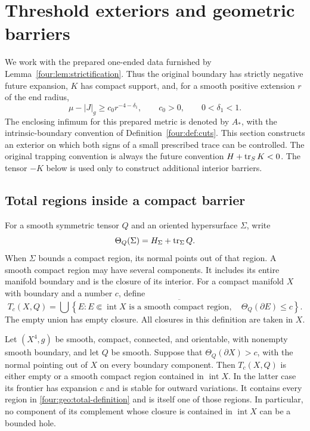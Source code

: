 \section{Threshold exteriors and geometric barriers}\label{four:sec:geometry}

We work with the prepared one-ended data furnished by
Lemma~\ref{four:lem:strictification}.  Thus the original boundary has strictly
negative future expansion, $K$ has compact support, and, for a smooth positive
extension $r$ of the end radius,
\begin{equation}\label{four:geo:prepared-gap}
 \mu-|J|_g\ge c_0r^{-4-\delta_1},\qquad c_0>0,\qquad 0<\delta_1<1.
\end{equation}
The enclosing infimum for this prepared metric is denoted by $A_*$, with the
intrinsic-boundary convention of Definition~\ref{four:def:cuts}.  This section
constructs an exterior on which both signs of a small prescribed trace can be
controlled.  The original trapping convention is always the future convention
$H+\operatorname{tr}_S K<0$.  The tensor $-K$ below is used only to construct additional
interior barriers.

\subsection{Total regions inside a compact barrier}

For a smooth symmetric tensor $Q$ and an oriented hypersurface $\Sigma$, write
\[
 \Theta_Q(\Sigma)=H_\Sigma+\operatorname{tr}_\Sigma Q.
\]
When $\Sigma$ bounds a compact region, its normal points out of that region.
A smooth compact region may have several components.  It includes its entire
manifold boundary and is the closure of its interior.  For a compact manifold
$X$ with boundary and a number $c$, define
\begin{equation}\label{four:geo:total-definition}
 T_c(X,Q)=\overline{\bigcup\left\{E:
 E\Subset\operatorname{int}X\text{ is a smooth compact region},\quad
 \Theta_Q(\partial E)\le c\right\}}.
\end{equation}
The empty union has empty closure.  All closures in this definition are taken
in $X$.

\begin{lemma}\label{four:geo:compact-total}
Let $(X^4,g)$ be smooth, compact, connected, and orientable, with nonempty
smooth boundary, and let $Q$ be smooth.  Suppose that
$\Theta_Q(\partial X)>c$, with the normal pointing out of $X$ on every
boundary component.  Then $T_c(X,Q)$ is either empty or a smooth compact
region contained in $\operatorname{int}X$.  In the latter case its frontier
has expansion $c$ and is stable for outward variations.  It contains every
region in \eqref{four:geo:total-definition} and is itself one of those regions.
In particular, no component of its complement whose closure is contained in
$\operatorname{int}X$ can be a bounded hole.
\end{lemma}

